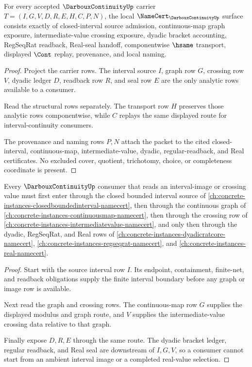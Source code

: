 \begin{theorem}
\label{thm:darboux-continuity-namecert-obligations}
For every accepted $\DarbouxContinuityUp$ carrier $T=(I,G,V,D,R,E,H,C,P,N)$, the local $\NameCert_{\DarbouxContinuityUp}$ surface consists exactly of closed-interval source admission, continuous-map graph exposure, intermediate-value crossing exposure, dyadic bracket accounting, RegSeqRat readback, Real-seal handoff, componentwise $\hsame$ transport, displayed $\Cont$ replay, provenance, and local naming.
\end{theorem}
\begin{proof}
Project the carrier rows. The interval source $I$, graph row $G$, crossing row $V$, dyadic ledger $D$, readback row $R$, and seal row $E$ are the only analytic rows available to a consumer.

Read the structural rows separately. The transport row $H$ preserves those analytic rows componentwise, while $C$ replays the same displayed route for interval-continuity consumers.

The provenance and naming rows $P,N$ attach the packet to the cited closed-interval, continuous-map, intermediate-value, dyadic, regular-readback, and Real certificates. No excluded cover, quotient, trichotomy, choice, or completeness coordinate is present.
\end{proof}

\begin{theorem}
\label{thm:darboux-continuity-source-route}
Every $\DarbouxContinuityUp$ consumer that reads an interval-image or crossing value must first enter through the closed bounded interval source of \autoref{ch:concrete-instances-closedboundedinterval-namecert}, then through the continuous graph of \autoref{ch:concrete-instances-continuousmap-namecert}, then through the crossing row of \autoref{ch:concrete-instances-intermediatevalue-namecert}, and only then through the dyadic, RegSeqRat, and Real rows of \autoref{ch:concrete-instances-dyadicratcore-namecert}, \autoref{ch:concrete-instances-regseqrat-namecert}, and \autoref{ch:concrete-instances-real-namecert}.
\end{theorem}
\begin{proof}
Start with the source interval row $I$. Its endpoint, containment, finite-net, and readback obligations supply the finite interval boundary before any graph or image row is available.

Next read the graph and crossing rows. The continuous-map row $G$ supplies the displayed modulus and graph route, and $V$ supplies the intermediate-value crossing data relative to that graph.

Finally expose $D,R,E$ through the same route. The dyadic bracket ledger, regular readback, and Real seal are downstream of $I,G,V$, so a consumer cannot start from an ambient interval image or a completed real-value selection.
\end{proof}

